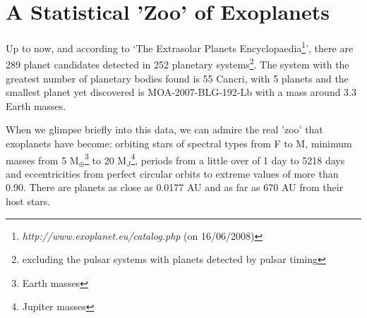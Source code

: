 \documentclass[dvips,12pt,a4paper]{report}
\begin{document}



\section {A Statistical 'Zoo' of Exoplanets}

Up to now, and according to `The Extrasolar Planets Encyclopaedia\footnote{\textit{http://www.exoplanet.eu/catalog.php} (on 16/06/2008)}', there are 289 planet candidates detected in 252 planetary systems\footnote{excluding the pulsar systems with planets detected by pulsar timing}. The system with the greatest number of planetary bodies found is 55 Cancri, with 5 planets \citep{Fischer-2008} and the smallest planet yet discovered is MOA-2007-BLG-192-Lb \citep{Bennett-2008} with a mass around 3.3 Earth masses.

When we glimpse briefly into this data, we can admire the real 'zoo' that exoplanets have become: orbiting stars of spectral types from F to M, minimum masses from 5 M$_{\oplus}$\footnote{Earth masses} to 20 M$_J$\footnote{Jupiter masses}, periods from a little over of 1 day to 5218 days and eccentricities from perfect circular orbits to extreme values of more than 0.90. There are planets as close as 0.0177 AU and as far as 670 AU from their host stars.
\end{document}
